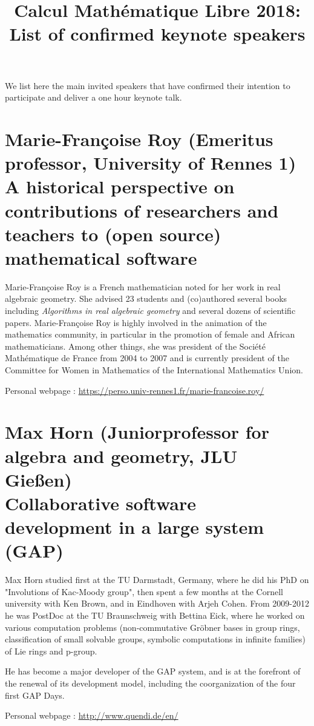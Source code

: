 \documentclass[12pt]{paper}
\title{Calcul Mathématique Libre 2018:\\ List of confirmed keynote speakers}
\date{}
\newcommand{\orateur}[3]{%
  \section*{%
    #1 {\small(#2)}\nopagebreak\\
    #3}
}
\begin{document}
\maketitle
\thispagestyle{empty}

We list here the main invited speakers that have confirmed their
intention to participate and deliver a one hour keynote talk.



\orateur
{Marie-Françoise Roy}
{Emeritus professor, University of Rennes 1}
{A historical perspective on contributions of researchers and teachers
  to (open source) mathematical software}

Marie-Françoise Roy is a French mathematician noted for her work in
real algebraic geometry. She advised 23 students and (co)authored
several books including \textit{Algorithms in real algebraic geometry} and
several dozens of scientific papers. Marie-Françoise Roy is highly
involved in the animation of the mathematics community, in particular
in the promotion of female and African mathematicians. Among other
things, she was president of the Société Mathématique de France from
2004 to 2007 and is currently president of the Committee for Women in
Mathematics of the International Mathematics Union.

Personal webpage : \url{https://perso.univ-rennes1.fr/marie-francoise.roy/}

\orateur
{Max Horn}
{Juniorprofessor for algebra and geometry, JLU Gießen}
{Collaborative software development in a large system (GAP)}
{
  Max Horn studied first at the TU Darmstadt, Germany, where he did
  his PhD on "Involutions of Kac-Moody group", then spent a few months
  at the Cornell university with Ken Brown, and in Eindhoven with
  Arjeh Cohen. From 2009-2012 he was PostDoc at the TU Braunschweig
  with Bettina Eick, where he worked on various computation problems
  (non-commutative Gröbner bases in group rings, classification of
  small solvable groups, symbolic computations in infinite families)
  of Lie rings and p-group.


  He has become a major developer of the GAP system, and is at the
  forefront of the renewal of its development model, including the
  coorganization of the four first GAP Days.

Personal webpage : \url{http://www.quendi.de/en/}
}
\end{document}
